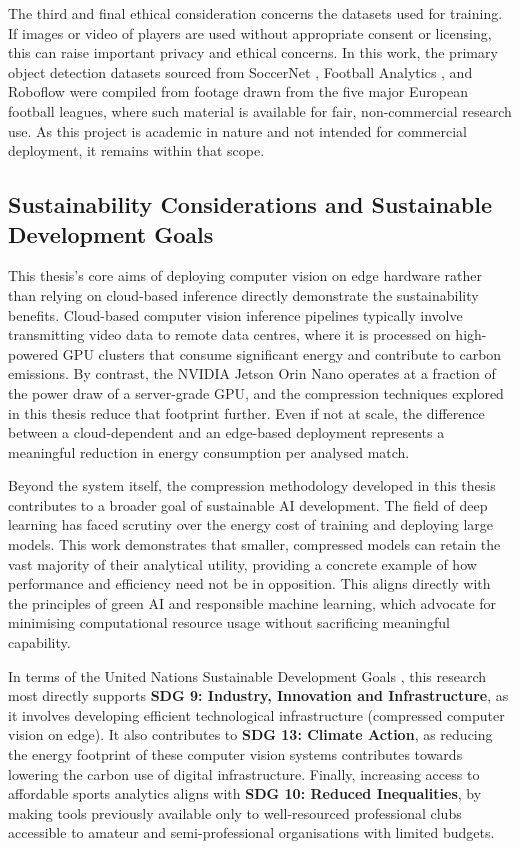 The third and final ethical consideration concerns the datasets used for training. If images or video of players are used without appropriate consent or licensing, this can raise important privacy and ethical concerns. In this work, the primary object detection datasets sourced from SoccerNet \cite{tracking}, Football Analytics \cite{roboflow_football_analytics_gnykk_model1}, and Roboflow \cite{roboflow} were compiled from footage drawn from the five major European football leagues, where such material is available for fair, non-commercial research use. As this project is academic in nature and not intended for commercial deployment, it remains within that scope. 
\subsection{Sustainability Considerations and Sustainable Development Goals}


This thesis's core aims of deploying computer vision on edge hardware rather than relying on cloud-based inference directly demonstrate the sustainability benefits. Cloud-based computer vision inference pipelines typically involve transmitting video data to remote data centres, where it is processed on high-powered GPU clusters that consume significant energy and contribute to carbon emissions. By contrast, the NVIDIA Jetson Orin Nano operates at a fraction of the power draw of a server-grade GPU, and the compression techniques explored in this thesis reduce that footprint further. Even if not at scale, the difference between a cloud-dependent and an edge-based deployment represents a meaningful reduction in energy consumption per analysed match.

Beyond the system itself, the compression methodology developed in this thesis contributes to a broader goal of sustainable AI development. The field of deep learning has faced scrutiny over the energy cost of training and deploying large models. This work demonstrates that smaller, compressed models can retain the vast majority of their analytical utility, providing a concrete example of how performance and efficiency need not be in opposition. This aligns directly with the principles of green AI and responsible machine learning, which advocate for minimising computational resource usage without sacrificing meaningful capability.

In terms of the United Nations Sustainable Development Goals \cite{un_sdgs}, this research most directly supports \textbf{SDG 9: Industry, Innovation and Infrastructure}, as it involves developing efficient technological infrastructure (compressed computer vision on edge). It also contributes to \textbf{SDG 13: Climate Action}, as reducing the energy footprint of these computer vision systems contributes towards lowering the carbon use of digital infrastructure. Finally, increasing access to affordable sports analytics aligns with \textbf{SDG 10: Reduced Inequalities}, by making tools previously available only to well-resourced professional clubs accessible to amateur and semi-professional organisations with limited budgets.